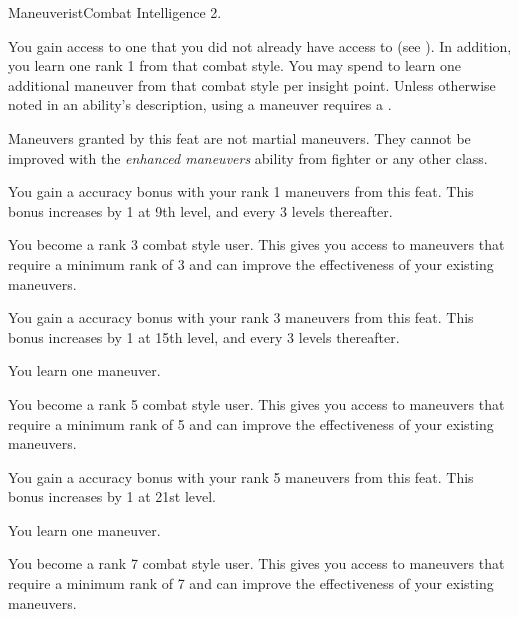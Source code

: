     \begin{feat}{Maneuverist}{Combat}
        \featpre Intelligence 2.

         You gain access to one  that you did not already have access to (see ).
        In addition, you learn one rank 1  from that combat style.
        You may spend  to learn one additional maneuver from that combat style per insight point.
        Unless otherwise noted in an ability's description, using a maneuver requires a .

        Maneuvers granted by this feat are not martial maneuvers.
        They cannot be improved with the \textit{enhanced maneuvers} ability from fighter or any other class.

         You gain a  accuracy bonus with your rank 1 maneuvers from this feat.
        This bonus increases by 1 at 9th level, and every 3 levels thereafter.

         You become a rank 3 combat style user.
        This gives you access to maneuvers that require a minimum rank of 3 and can improve the effectiveness of your existing maneuvers.

         You gain a  accuracy bonus with your rank 3 maneuvers from this feat.
        This bonus increases by 1 at 15th level, and every 3 levels thereafter.

         You learn one maneuver.

         You become a rank 5 combat style user.
        This gives you access to maneuvers that require a minimum rank of 5 and can improve the effectiveness of your existing maneuvers.

         You gain a  accuracy bonus with your rank 5 maneuvers from this feat.
        This bonus increases by 1 at 21st level.

         You learn one maneuver.

         You become a rank 7 combat style user.
        This gives you access to maneuvers that require a minimum rank of 7 and can improve the effectiveness of your existing maneuvers.
    \end{feat}

